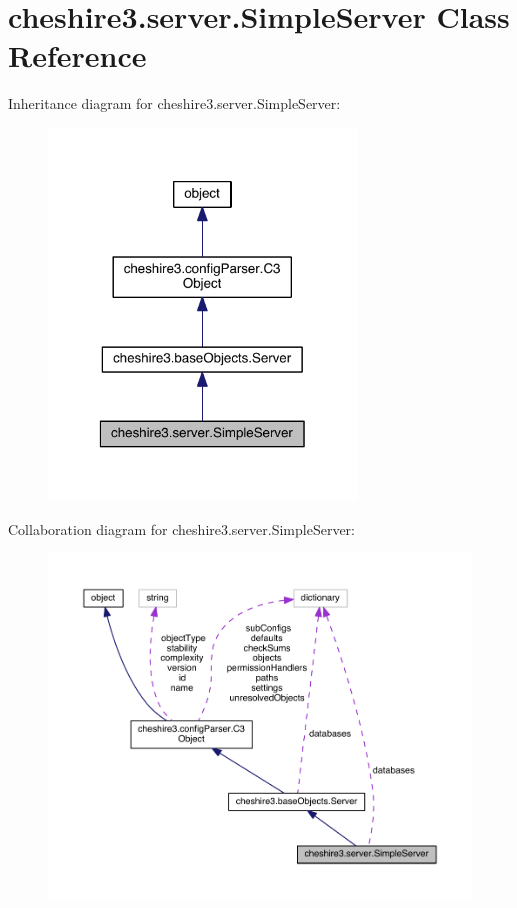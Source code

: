 \hypertarget{classcheshire3_1_1server_1_1_simple_server}{\section{cheshire3.\-server.\-Simple\-Server Class Reference}
\label{classcheshire3_1_1server_1_1_simple_server}
}


Inheritance diagram for cheshire3.\-server.\-Simple\-Server\-:
\nopagebreak
\begin{figure}[H]
\begin{center}
\leavevmode
\includegraphics[width=232pt]{classcheshire3_1_1server_1_1_simple_server__inherit__graph}
\end{center}
\end{figure}


Collaboration diagram for cheshire3.\-server.\-Simple\-Server\-:
\nopagebreak
\begin{figure}[H]
\begin{center}
\leavevmode
\includegraphics[width=350pt]{classcheshire3_1_1server_1_1_simple_server__coll__graph}
\end{center}
\end{figure}
